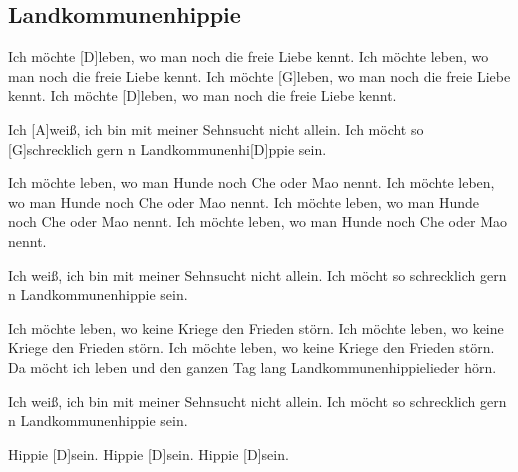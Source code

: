 \subsection*{Landkommunenhippie   }
\begin{guitar}

    Ich möchte [D]leben, wo man noch die freie Liebe kennt. 
    Ich möchte leben, wo man noch die freie Liebe kennt. 
    Ich möchte [G]leben, wo man noch die freie Liebe kennt. 
    Ich möchte [D]leben, wo man noch die freie Liebe kennt.


    Ich [A]weiß, ich bin mit meiner Sehnsucht nicht allein. 
    Ich möcht so [G]schrecklich gern n Landkommunenhi[D]ppie sein. 


    Ich möchte leben, wo man Hunde noch Che oder Mao nennt. 
    Ich möchte leben, wo man Hunde noch Che oder Mao nennt. 
    Ich möchte leben, wo man Hunde noch Che oder Mao nennt. 
    Ich möchte leben, wo man Hunde noch Che oder Mao nennt. 


    Ich weiß, ich bin mit meiner Sehnsucht nicht allein. 
    Ich möcht so schrecklich gern n Landkommunenhippie sein. 


    Ich möchte leben, wo keine Kriege den Frieden störn. 
    Ich möchte leben, wo keine Kriege den Frieden störn. 
    Ich möchte leben, wo keine Kriege den Frieden störn. 
    Da möcht ich leben und den ganzen Tag lang Landkommunenhippielieder hörn. 


    Ich weiß, ich bin mit meiner Sehnsucht nicht allein. 
    Ich möcht so schrecklich gern n Landkommunenhippie sein. 


    Hippie [D]sein. 
    Hippie [D]sein. 
    Hippie [D]sein. 

\end{guitar}
